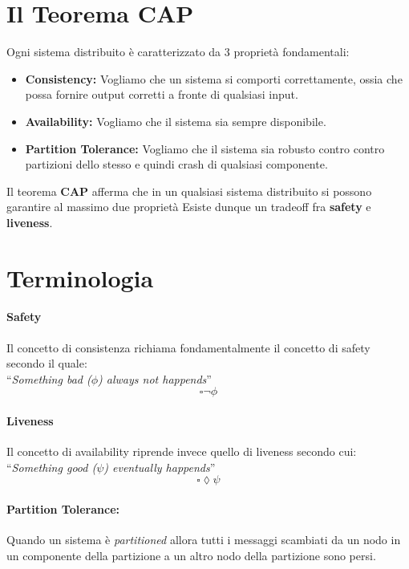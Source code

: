 	\section{Il Teorema CAP}
	Ogni sistema distribuito è caratterizzato da 3 proprietà fondamentali:
	\begin{itemize}
	  	\item{\textbf{Consistency:}}
	  	Vogliamo che un sistema si comporti correttamente, ossia che possa fornire output corretti a fronte di qualsiasi input.
	  	\item{\textbf{Availability:}}
	  	Vogliamo che il sistema sia sempre disponibile.
	  	\item{\textbf{Partition Tolerance:}}
	  	Vogliamo che il sistema sia robusto contro contro partizioni dello stesso e quindi crash di qualsiasi componente.
	  \end{itemize}
	Il teorema \textbf{CAP} afferma che in un qualsiasi sistema distribuito si possono garantire al massimo due proprietà \cite[Brewer:2000]{Brewer:2000}
	Esiste dunque un tradeoff fra \textbf{safety} e \textbf{liveness}.

	\section{Terminologia}
		\paragraph{Safety}
		Il concetto di consistenza richiama fondamentalmente il concetto di safety secondo il quale:\\ ``\emph{Something bad ($\phi$) always not happends}'' 
		\begin{equation}
			\square \lnot \phi
		\end{equation}
		\paragraph{Liveness}
		Il concetto di availability riprende invece quello di liveness secondo cui:\\
		``\emph{Something good ($\psi$) eventually happends}''
		\begin{equation}
			\square \lozenge \psi
		\end{equation}
		\paragraph{Partition Tolerance:}
		Quando un sistema è \textit{partitioned} allora tutti i messaggi scambiati da un nodo in un componente della partizione a un altro nodo della partizione sono persi.
